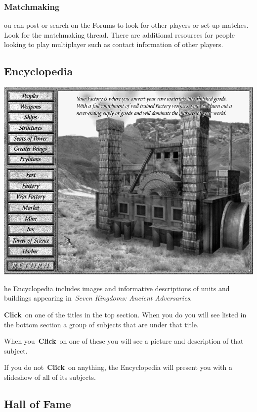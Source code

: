 \subsubsection{Matchmaking}

ou can post or search on the Forums to look for other players or set up matches. Look for the matchmaking thread. There are additional resources for people looking to play multiplayer such as contact information of other players.

\subsection{Encyclopedia}


\begin{center}
	\includegraphics[width=0.9\linewidth]{Iencyclopedia} %
\end{center}

he Encyclopedia includes images and informative descriptions of units and buildings appearing in \textit{Seven Kingdoms: Ancient Adversaries}.

\textbf{Click} on one of the titles in the top section. When you do you will see listed in the bottom section a group of subjects that are under that title.

When you \textbf{Click} on one of these you will see a picture and description of that subject.

If you do not \textbf{Click} on anything, the Encyclopedia will present you with a slideshow of all of its subjects.

\subsection{Hall of Fame}

